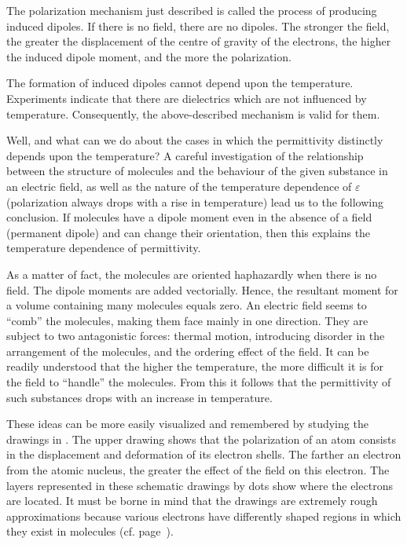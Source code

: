 The polarization mechanism just described is called the process of producing induced dipoles. If there is no field, there are no dipoles. The stronger the field, the greater the displacement of the centre of gravity of the electrons, the higher the induced dipole moment, and the more the polarization.

The formation of induced dipoles cannot depend upon the temperature. Experiments indicate that there are dielectrics which are not influenced by temperature. Consequently, the above-described mechanism is valid for them.

Well, and what can we do about the cases in which the permittivity distinctly depends upon the temperature? A careful investigation of the relationship between the structure of molecules and the behaviour of the given substance in an electric field, as well as the nature of the temperature dependence of $\varepsilon$ (polarization always drops with a rise in temperature) lead us to the following conclusion. If molecules have a dipole moment even in the absence of a field (permanent dipole) and can change their orientation, then this explains the temperature dependence of permittivity.

As a matter of fact, the molecules are oriented haphazardly when there is no field. The dipole moments are added vectorially. Hence, the resultant moment for a volume containing many molecules equals zero. An electric field seems to ``comb'' the molecules, making them face mainly in one direction. They are subject to two antagonistic forces: thermal motion, introducing disorder in the arrangement of the molecules, and the ordering effect of the field. It can be readily understood that the higher the temperature, the more difficult it is for the field to ``handle'' the molecules. From this it follows that the permittivity of such substances drops with an increase in temperature.

These ideas can be more easily visualized and remembered by studying the drawings in . The upper drawing shows that the polarization of an atom consists in the displacement and deformation of its electron shells. The farther an electron from the atomic nucleus, the greater the effect of the field on this electron. The layers represented in these schematic drawings by dots show where the electrons are located. It must be borne in mind that the drawings are extremely rough approximations because various electrons have differently shaped regions in which they exist in molecules (cf. page~\pageref{cloud-shape}).

